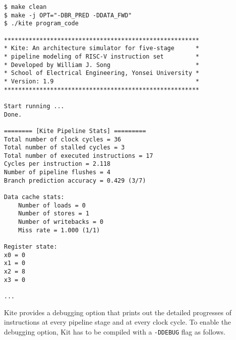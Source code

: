 \documentclass[10pt]{article}
\begin{document}
\begin{Verbatim}[frame=single]
$ make clean
$ make -j OPT="-DBR_PRED -DDATA_FWD"
$ ./kite program_code

*******************************************************
* Kite: An architecture simulator for five-stage      *
* pipeline modeling of RISC-V instruction set         *
* Developed by William J. Song                        *
* School of Electrical Engineering, Yonsei University *
* Version: 1.9                                        *
*******************************************************

Start running ...
Done.

======== [Kite Pipeline Stats] =========
Total number of clock cycles = 36
Total number of stalled cycles = 3
Total number of executed instructions = 17
Cycles per instruction = 2.118
Number of pipeline flushes = 4
Branch prediction accuracy = 0.429 (3/7)

Data cache stats:
    Number of loads = 0
    Number of stores = 1
    Number of writebacks = 0
    Miss rate = 1.000 (1/1)

Register state:
x0 = 0
x1 = 0
x2 = 8
x3 = 0

...

\end{Verbatim}

Kite provides a debugging option that prints out the detailed progresses of instructions at every pipeline stage and at every clock cycle.
To enable the debugging option, Kit has to be compiled with a {\tt -DDEBUG} flag as follows.
\end{document}
